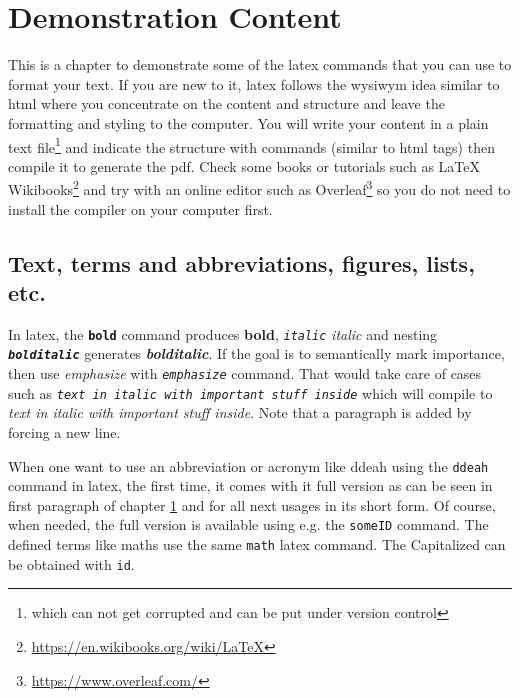 \vspace{21.5pt}
\chapter{Demonstration Content}\label{demo:content}

This is a chapter to demonstrate some of the \gls{latex} commands that you can use to format your text. If you are new to it, \gls{latex} follows the \gls{wysiwym} idea similar to \gls{html} where you concentrate on the content and structure and leave the formatting and styling to the computer. You will write your content in a plain text file\footnote{which can not get corrupted and can be put under version control} and indicate the structure with commands (similar to \gls{html} tags) then compile it to generate the pdf. Check some books or tutorials such as \LaTeX{} Wikibooks\footnote{\url{https://en.wikibooks.org/wiki/LaTeX}} and try with an online editor such as Overleaf\footnote{\url{https://www.overleaf.com/}} so you do not need to install the compiler on your computer first.

\section{Text, terms and abbreviations, figures, lists, etc.}

In \gls{latex}, the \texttt{\textbf{bold}} command produces \textbf{bold}, \texttt{\textit{italic}}  \textit{italic} and nesting \texttt{\textbf{\textit{bolditalic}}} generates \textbf{\textit{bolditalic}}. If the goal is to semantically mark importance, then use \emph{emphasize} with \texttt{\emph{emphasize}} command. That would take care of cases such as \texttt{\textit{text in italic with \emph{important stuff} inside}} which will compile to \textit{text in italic with \emph{important stuff} inside}. Note that a paragraph is added by forcing a new line.

When one want to use an abbreviation or acronym like \gls{ddeah} using the \texttt{\gls{ddeah}} command in \gls{latex}, the first time, it comes with it full version as can be seen in first paragraph of chapter \ref{demo:content} and for all next usages in its short form. Of course, when needed, the full version is available using e.g. the \texttt{\acrlong{someID}} command. The defined terms like \gls{maths} use the same \texttt{\gls{math}} \gls{latex} command. The Capitalized can be obtained with \texttt{\Gls{id}}.

